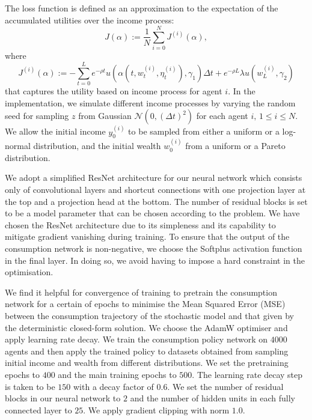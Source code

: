 \documentclass[11pt,oneside,english,reqno,dvipsnames,table]{amsart}
\numberwithin{equation}{section}
\theoremstyle{plain}
\theoremstyle{definition}
\theoremstyle{remark}
\theoremstyle{plain}
\theoremstyle{plain}
\theoremstyle{plain}
\theoremstyle{plain}
\theoremstyle{plain}
\theoremstyle{plain}
\theoremstyle{plain}
\newcommand{\cN}{\mathcal{N}}
\numberwithin{thm}{section}
\begin{document}
The loss function is defined as an approximation to the expectation of the accumulated utilities over the income process:
\begin{equation}\label{loss function: stochastic income, fixed interest rate}
    J(\alpha) := \frac{1}{N} \sum_{i=0} ^N J^{(i)}(\alpha),
\end{equation}
where 
\begin{equation*}
    J^{(i)}(\alpha) := - \sum_{t=0} ^L e^{-\rho t}u(\alpha(t,w^{(i)} _t, \eta_t ^{(i)}),\gamma_1) \Delta t + e^{-\rho L} \lambda u(w^{(i)} _L, \gamma_2)
\end{equation*}
that captures the utility based on income process for agent $i$. In the implementation, we simulate different income processes by varying the random seed for sampling $z$ from Gaussian $\cN(0, (\Delta t)^2 )$ for each agent $i, \, 1 \leq i \leq N$. We allow the initial income $y^{(i)} _0$ to be sampled from either a uniform or a log-normal distribution, and the initial wealth $w^{(i)} _0$ from a uniform or a Pareto distribution. 

We adopt a simplified ResNet architecture \cite{he2015deep} for our neural network which consists only of convolutional layers and shortcut connections with one projection layer at the top and a projection head at the bottom. The number of residual blocks is set to be a model parameter that can be chosen according to the problem. We have chosen the ResNet architecture due to its simpleness and its capability to mitigate gradient vanishing during training. To ensure that the output of the consumption network is non-negative, we choose the Softplus activation function in the final layer. In doing so, we avoid having to impose a hard constraint in the optimisation. 

We find it helpful for convergence of training to pretrain the consumption network for a certain of epochs to minimise the Mean Squared Error (MSE) between the consumption trajectory of the stochastic model and that given by the deterministic closed-form solution. We choose the AdamW optimiser \cite{loshchilov2018decoupled} and apply learning rate decay. We train the consumption policy network on $4000$ agents and then apply the trained policy to datasets obtained from sampling initial income and wealth from different distributions. We set the pretraining epochs to $400$ and the main training epochs to $500$. The learning rate decay step is taken to be $150$ with a decay factor of $0.6$. We set the number of residual blocks in our neural network to $2$ and the number of hidden units in each fully connected layer to $25$. We apply gradient clipping with norm $1.0$.
\end{document}
